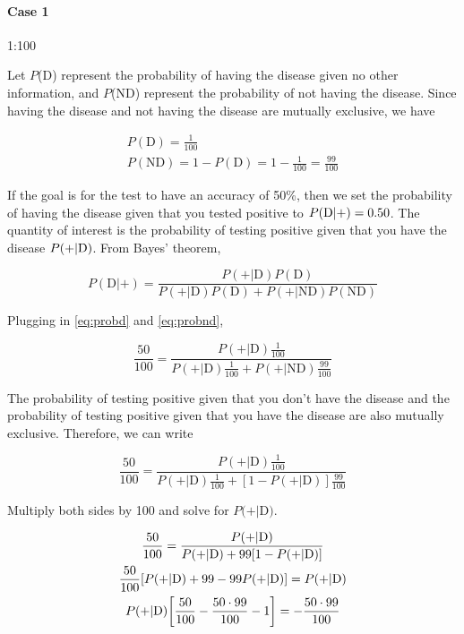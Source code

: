 \documentclass[9pt,a4paper,twocolumn]{article}
\begin{document}
\paragraph{Case 1} 1:100

Let $P$(D) represent the probability of having the disease given no other information, and $P$(ND) represent the probability of not having the disease. Since having the disease and not having the disease are mutually exclusive, we have

\begin{eqnarray}
	P(\mathrm{D}) = \frac{1}{100} \label{eq:probd}\\
	P(\mathrm{ND}) = 1 - P(\mathrm{D}) = 1 - \frac{1}{100} = \frac{99}{100}	\label{eq:probnd}
\end{eqnarray}

If the goal is for the test to have an accuracy of 50\%, then we set the probability of having the disease given that you tested positive to $P\qty(\mathrm{D}|+) = 0.50$. The quantity of interest is the probability of testing positive given that you have the disease $P\qty(+|\mathrm{D})$. From Bayes' theorem,

\begin{equation}\label{eq:bayes}
	P(\mathrm{D}|+) = \frac{P(+|\mathrm{D}) P(\mathrm{D})}{P(+|\mathrm{D}) P(\mathrm{D}) + P(+|\mathrm{ND}) P(\mathrm{ND})}
\end{equation}

Plugging in \eqref{eq:probd} and \eqref{eq:probnd},

\begin{equation}
	\frac{50}{100} = \frac{P(+|\mathrm{D}) \frac{1}{100}}{P(+|\mathrm{D}) \frac{1}{100} + P(+|\mathrm{ND}) \frac{99}{100}}
\end{equation}

The probability of testing positive given that you don't have the disease and the probability of testing positive given that you have the disease are also mutually exclusive. Therefore, we can write

\begin{equation}
	\frac{50}{100} = \frac{P(+|\mathrm{D}) \frac{1}{100}}{P(+|\mathrm{D}) \frac{1}{100} + [1 - P(+|\mathrm{D})] \frac{99}{100}}
\end{equation}

Multiply both sides by 100 and solve for $P(+|$D$)$.

\begin{gather*}
	\frac{50}{100} = \frac{P(+|\mathrm{D})}{P(+|\mathrm{D}) + 99 [1 - P(+|\mathrm{D})]} \\
	\frac{50}{100}\qty[P(+|\mathrm{D}) + 99 - 99P(+|\mathrm{D})] = P(+|\mathrm{D}) \\
	P(+|\mathrm{D})\qty[\frac{50}{100} - \frac{50\cdot 99}{100} - 1] = -\frac{50\cdot 99}{100}
\end{gather*}
\end{document}
